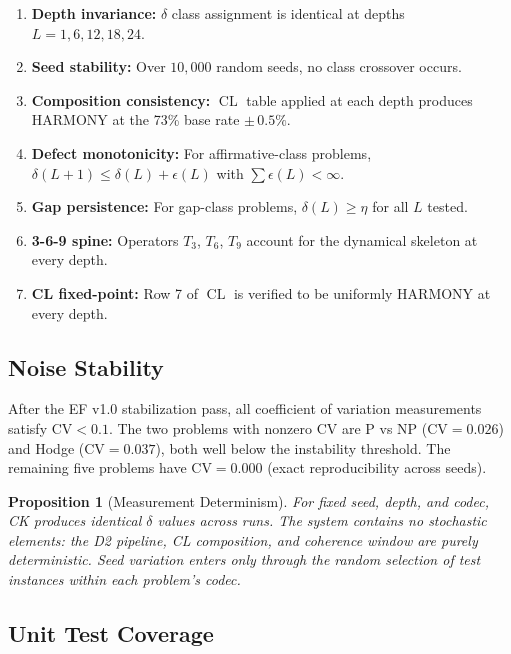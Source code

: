 \documentclass[11pt]{article}
\newtheorem{proposition}[theorem]{Proposition}
\DeclareMathOperator{\CL}{CL}
\begin{document}
\begin{enumerate}
\item \textbf{Depth invariance:} $\delta$ class assignment is
identical at depths $L = 1, 6, 12, 18, 24$.
\item \textbf{Seed stability:} Over $10{,}000$ random seeds,
no class crossover occurs.
\item \textbf{Composition consistency:} $\CL$ table applied at
each depth produces HARMONY at the 73\% base rate
$\pm\, 0.5\%$.
\item \textbf{Defect monotonicity:} For affirmative-class problems,
$\delta(L+1) \leq \delta(L) + \epsilon(L)$ with
$\sum \epsilon(L) < \infty$.
\item \textbf{Gap persistence:} For gap-class problems,
$\delta(L) \geq \eta$ for all $L$ tested.
\item \textbf{3-6-9 spine:} Operators $T_3$, $T_6$, $T_9$ account
for the dynamical skeleton at every depth.
\item \textbf{CL fixed-point:} Row 7 of $\CL$ is verified to be
uniformly HARMONY at every depth.
\end{enumerate}

\subsection{Noise Stability}
\label{subsec:noise}

After the EF v1.0 stabilization pass, all coefficient of
variation measurements satisfy $\mathrm{CV} < 0.1$.  The two
problems with nonzero CV are P vs NP ($\mathrm{CV} = 0.026$) and
Hodge ($\mathrm{CV} = 0.037$), both well below the instability
threshold.  The remaining five problems have $\mathrm{CV} = 0.000$
(exact reproducibility across seeds).

\begin{proposition}[Measurement Determinism]
\label{prop:determinism}
For fixed seed, depth, and codec, CK produces identical $\delta$
values across runs.  The system contains no stochastic elements:
the D2 pipeline, CL composition, and coherence window are purely
deterministic.  Seed variation enters only through the random
selection of test instances within each problem's codec.
\end{proposition}

\subsection{Unit Test Coverage}
\label{subsec:tests}
\end{document}
